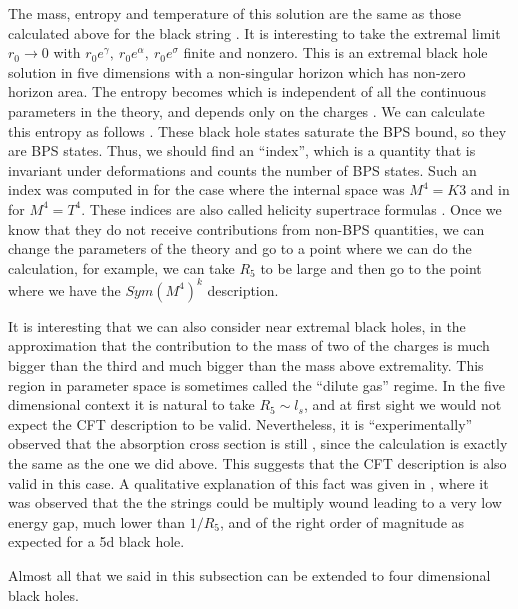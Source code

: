 The mass, entropy and temperature of this solution are the same
as those calculated above for the black string \mss \entropyfd \thwk .
It is interesting to take the extremal limit $r_0 \to 0$ with
$r_0e^\gamma,~r_0 e^\alpha,~r_0 e^\sigma $ finite and nonzero. 
This is an extremal black hole solution in five dimensions with
a non-singular horizon which has non-zero horizon area. 
The entropy becomes
which is independent of all the continuous parameters in the theory, and
depends only on the charges \charges .
We can calculate this entropy as follows \cite{Strominger:1996sh}. 
These black hole states saturate the BPS bound, so they are
BPS states. Thus, we should find an ``index'', which is
a quantity that is invariant under deformations and counts the
number of BPS states. Such an index was computed in 
\cite{Strominger:1996sh} for the case where the internal space was
$M^4=K3$ and in \cite{Maldacena:1999bp} for $M^4=T^4$. 
These indices are also called  helicity supertrace formulas
 \cite{Kiritsis:1997gu}. Once we know that they do not
receive contributions from non-BPS quantities, we can change the
parameters of the theory and go to a point where we can do the
calculation, for example, we can take $R_5$ to be large and then go to 
the point where we have the $Sym(M^4)^k$ description. 

It is interesting that we can also consider near extremal black 
holes, in the approximation that the contribution to the mass
of two of the charges is much bigger than the third and much
bigger than the mass above extremality. This region in parameter
space is sometimes called the ``dilute gas'' regime. 
In the five dimensional context it is natural to take $R_5 \sim l_s$,
and at first sight we would not  expect the CFT description to
be valid. Nevertheless, it is ``experimentally'' observed
that the absorption cross section is still  \absor ,
since the calculation is exactly the same as the one we did above.
This suggests that the CFT description is also valid in this case.
A qualitative explanation of this fact was given in 
\cite{Maldacena:1996ds}, where it was observed that the the strings
could be multiply wound leading to a very low energy gap, much lower
than $1/R_5$, and of the right order of magnitude as expected for
a 5d black hole. 

Almost all that we said in this subsection can be extended to four 
dimensional black holes.









%
